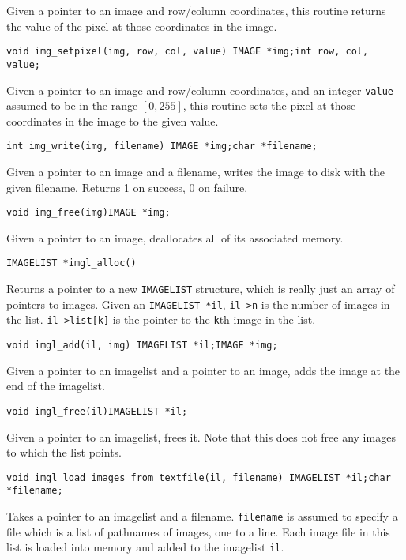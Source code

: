 \begin{description}
Given a pointer to an image and row/column coordinates, this routine returns
the value of the pixel at those coordinates in the image.

\item {\tt void img\_setpixel(img, row, col, value)\newline
IMAGE *img;\newline int row, col, value;}

Given a pointer to an image and row/column coordinates, and an integer
{\tt value}
assumed to be in the range $[0, 255]$, this routine sets the pixel
at those coordinates in the image to the given value.

\item {\tt int img\_write(img, filename)\newline
IMAGE *img;\newline char *filename;}

Given a pointer to an image and a filename, writes the image to disk with
the given filename.  Returns 1 on success, 0 on failure.

\item {\tt void img\_free(img)\newline IMAGE *img;}

Given a pointer to an image, deallocates all of its associated memory.

\item {\tt IMAGELIST *imgl\_alloc()}

Returns a pointer to a new {\tt IMAGELIST} structure, which is really just
an array of pointers to images.  Given an {\tt IMAGELIST *il},
{\tt il->n} is the number of images in the list.  {\tt il->list[k]}
is the pointer to the {\tt k}th image in the list.

\item {\tt void imgl\_add(il, img)\newline
IMAGELIST *il;\newline IMAGE *img;}

Given a pointer to an imagelist and a pointer to an image, adds the image
at the end of the imagelist.

\item {\tt void imgl\_free(il)\newline IMAGELIST *il;}

Given a pointer to an imagelist, frees it.  Note that this does not
free any images to which the list points.

\item {\tt void imgl\_load\_images\_from\_textfile(il, filename)\newline
IMAGELIST *il;\newline char *filename;}

Takes a pointer to an imagelist and a filename.  {\tt filename} is
assumed to specify a file which is a list of pathnames of images,
one to a line.  Each image file in this list is loaded into memory
and added to the imagelist {\tt il}.

\end{description}


